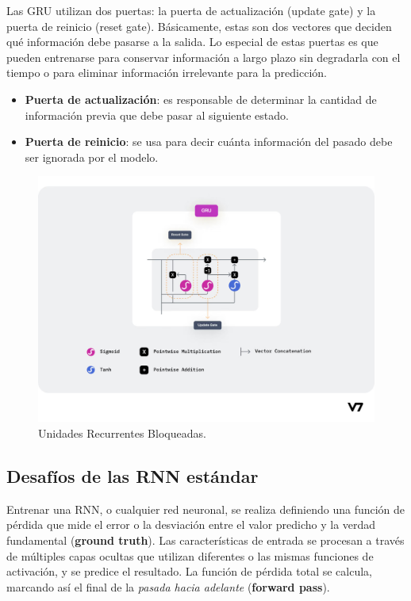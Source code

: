 \documentclass{article}
\begin{document}
Las GRU utilizan dos puertas: la puerta de actualización (update gate) y la puerta de reinicio (reset gate). Básicamente, estas son dos vectores que deciden qué información debe pasarse a la salida. Lo especial de estas puertas es que pueden entrenarse para conservar información a largo plazo sin degradarla con el tiempo o para eliminar información irrelevante para la predicción.

\begin{itemize}
    \item \textbf{Puerta de actualización}: es responsable de determinar la cantidad de información previa que debe pasar al siguiente estado.
    \item \textbf{Puerta de reinicio}: se usa para decir cuánta información del pasado debe ser ignorada por el modelo.
\end{itemize}

\begin{figure}[H]
    \centering
    \includegraphics[scale=0.3]{gru.png}
    \caption{Unidades Recurrentes Bloqueadas.}
\end{figure}

\newpage

\subsection{Desafíos de las RNN estándar}
Entrenar una RNN, o cualquier red neuronal, se realiza definiendo una función de pérdida que mide el error o la desviación entre el valor predicho y la verdad fundamental (\textbf{ground truth}). Las características de entrada se procesan a través de múltiples capas ocultas que utilizan diferentes o las mismas funciones de activación, y se predice el resultado. La función de pérdida total se calcula, marcando así el final de la \textit{pasada hacia adelante} (\textbf{forward pass}). \\
\end{document}
